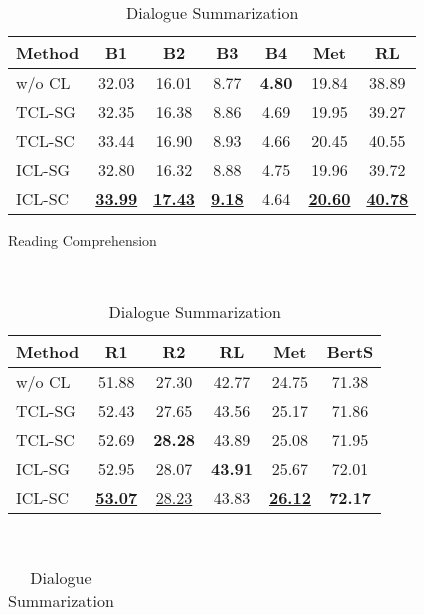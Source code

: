 \begin{table}[th!]
	\small
	\centering
	\begin{subtable}{\linewidth}
		\scriptsize
		\centering
		\begin{tabular}{lcccccc}
			\hline
			{Method} & {B1} & {B2} & {B3} & {B4} & {Met} & {RL}\\
			\hline
			w/o CL &  32.03 & 16.01 & 8.77 & \textbf{4.80} & 19.84 & 38.89\\
			TCL-SG &  32.35 & 16.38 & 8.86 & 4.69 & 19.95 & 39.27 \\
			\hline
			TCL-SC & 33.44 & 16.90 & 8.93 & 4.66 & 20.45 & 40.55\\
			ICL-SG & 32.80 & 16.32 & 8.88 & 4.75 & 19.96 & 39.72 \\
			ICL-SC &  \underline{\textbf{33.99}} & \underline{\textbf{17.43}} & \underline{\textbf{9.18 }}& 4.64 & \underline{\textbf{20.60}}& \underline{\textbf{40.78}}\\
			\hline
		\end{tabular}
		\caption{Reading Comprehension}
		\label{tab:end2endrc}
	\end{subtable}
	\\[5pt]
	\begin{subtable}{\linewidth}
		\scriptsize
		\centering
		\begin{tabular}{lccccc}
			\hline
			{Method} & {R1} & {R2} & {RL} & {Met} & {BertS} \\
			\hline
			w/o CL & 51.88 & 27.30 & 42.77 & 24.75 & 71.38 \\
			TCL-SG & 52.43 & 27.65 & 43.56 & 25.17 & 71.86 \\
			\hline
			TCL-SC & 52.69 & \textbf{28.28 }& 43.89 & 25.08 & 71.95 \\
			ICL-SG & 52.95 & 28.07 & \textbf{43.91} & 25.67 & 72.01 \\
			ICL-SC & \underline{\textbf{53.07}} & \underline{28.23} & {43.83} & \underline{\textbf{26.12}}& {\textbf{72.17}} \\
			
			\hline
		\end{tabular}
		\caption{Dialogue Summarization}
		\label{tab:end2endds}
	\end{subtable}
	\\[5pt]
	\begin{subtable}{\linewidth}
		\scriptsize
		\centering
		\begin{tabular}{lccccc}
			

\end{tabular}
\end{subtable}
\end{table}
